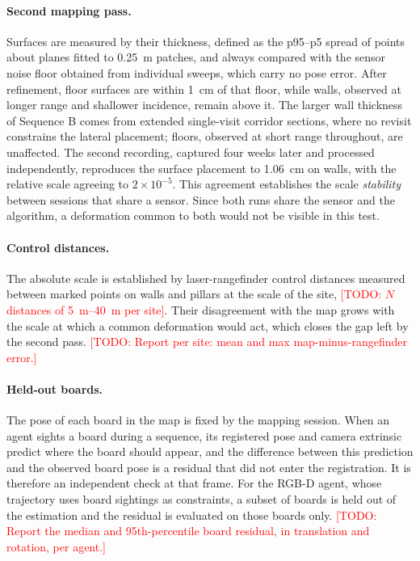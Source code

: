 \documentclass[conference]{IEEEtran}
\newcommand{\todo}[1]{\textcolor{red}{[TODO: #1]}}
\begin{document}
\paragraph{Second mapping pass.} Surfaces are measured by their
thickness, defined as the p95--p5 spread of points about planes
fitted to \SI{0.25}{\metre} patches, and always compared with the
sensor noise floor obtained from individual sweeps, which carry no
pose error. After refinement, floor surfaces are within
\SI{1}{\centi\metre} of that floor, while walls, observed at longer
range and shallower incidence, remain above it. The larger wall
thickness of Sequence B comes from extended single-visit corridor
sections, where no revisit constrains the lateral placement; floors,
observed at short range throughout, are unaffected. The second
recording, captured four weeks later and processed independently,
reproduces the surface placement to \SI{1.06}{\centi\metre} on walls,
with the relative scale agreeing to $2\times10^{-5}$. This agreement
establishes the scale \emph{stability} between sessions that share a
sensor. Since both runs share the sensor and the algorithm, a
deformation common to both would not be visible in this test.

\paragraph{Control distances.} The absolute scale is established by
laser-rangefinder control distances measured between marked points on
walls and pillars at the scale of the site, \todo{$N$ distances of
\SIrange{5}{40}{\metre} per site}. Their disagreement with the map
grows with the scale at which a common deformation would act, which
closes the gap left by the second pass. \todo{Report per site: mean
and max map-minus-rangefinder error.}

\paragraph{Held-out boards.} The pose of each board in the map is
fixed by the mapping session. When an agent sights a board during a
sequence, its registered pose and camera extrinsic predict where the
board should appear, and the difference between this prediction and
the observed board pose is a residual that did not enter the
registration. It is therefore an independent check at that frame.
For the RGB-D agent, whose trajectory uses board sightings as
constraints, a subset of boards is held out of the estimation and the
residual is evaluated on those boards only. \todo{Report the median
and 95th-percentile board residual, in translation and rotation, per
agent.}
\end{document}
